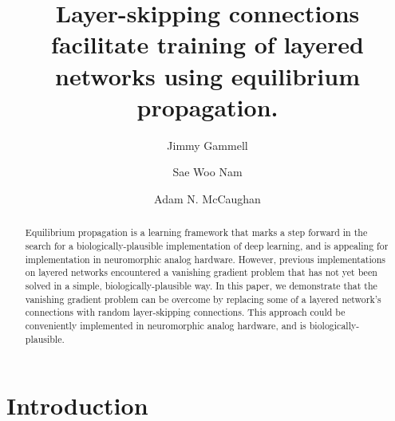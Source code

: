 \documentclass[utf8]{frontiersSCNS}
\title{Layer-skipping connections facilitate training of layered networks using equilibrium propagation.}
\author{Jimmy Gammell \and Sae Woo Nam \and Adam N. McCaughan}
\begin{document}
\begin{abstract}

Equilibrium propagation is a learning framework that marks a step forward in the search for a biologically-plausible implementation of deep learning, and is appealing for implementation in neuromorphic analog hardware. However, previous implementations on layered networks encountered a vanishing gradient problem that has not yet been solved in a simple, biologically-plausible way. In this paper, we demonstrate that the vanishing gradient problem can be overcome by replacing some of a layered network's connections with random layer-skipping connections. This approach could be conveniently implemented in neuromorphic analog hardware, and is biologically-plausible.

\end{abstract}

\maketitle

\section{Introduction}
\end{document}
